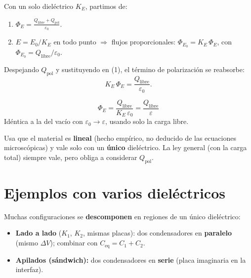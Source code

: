 \documentclass[12pt,a4paper]{article}
\begin{document}
Con un solo dieléctrico $K_E$, partimos de:
\begin{enumerate}[nosep]
  \item $\displaystyle \Phi_E = \frac{Q_{\text{libre}} + Q_{\text{pol}}}{\varepsilon_0}$.
  \item $E = E_0/K_E$ en todo punto $\Rightarrow$ flujos proporcionales:
        $\Phi_{E_0} = K_E\,\Phi_E$, con
        $\Phi_{E_0} = Q_{\text{libre}}/\varepsilon_0$.
\end{enumerate}

Despejando $Q_{\text{pol}}$ y sustituyendo en (1), el término de
polarización se reabsorbe:
\[
K_E\,\Phi_E = \frac{Q_{\text{libre}}}{\varepsilon_0}.
\]

\begin{keybox}
  \[
  \boxed{\Phi_E = \frac{Q_{\text{libre}}}{K_E\,\varepsilon_0}
        = \frac{Q_{\text{libre}}}{\varepsilon}}
  \]
  Idéntica a la del vacío con $\varepsilon_0 \to \varepsilon$, usando
  solo la carga libre.
\end{keybox}

\begin{warnbox}[Salvedad]
  Usa que el material es \textbf{lineal} (hecho empírico, no deducido de
  las ecuaciones microscópicas) y vale solo con un \textbf{único}
  dieléctrico. La ley general (con la carga total) siempre vale, pero
  obliga a considerar $Q_{\text{pol}}$.
\end{warnbox}



\section{Ejemplos con varios dieléctricos}

Muchas configuraciones se \textbf{descomponen} en regiones de un único
dieléctrico:
\begin{itemize}[nosep]
  \item \textbf{Lado a lado} ($K_1$, $K_2$, mismas placas): dos
        condensadores en \textbf{paralelo} (mismo $\Delta V$); combinar
        con $C_{\text{eq}}=C_1+C_2$.
  \item \textbf{Apilados (sándwich):} dos condensadores en \textbf{serie}
        (placa imaginaria en la interfaz).
\end{itemize}
\end{document}
